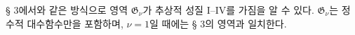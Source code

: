 
§ 3에서와 같은 방식으로 영역 $\mathfrak G_\nu$가 추상적 성질 I--IV를 가짐을 알 수 있다. $\mathfrak G_\nu$는 정수적 대수함수만을 포함하며, $\nu=1$일 때에는 § 3의 영역과 일치한다.
